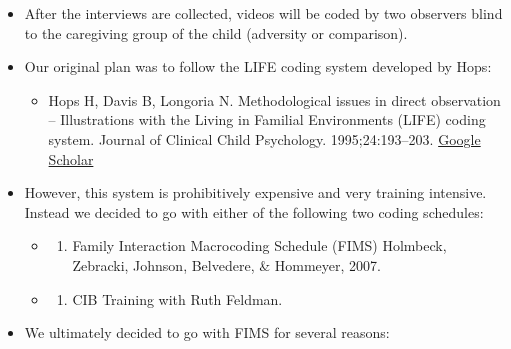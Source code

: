 \documentclass[]{book}
\providecommand{\tightlist}{%
  \setlength{\itemsep}{0pt}\setlength{\parskip}{0pt}}
\begin{document}
\begin{itemize}
\item
  After the interviews are collected, videos will be coded by two observers blind to the caregiving group of the child (adversity or comparison).
\item
  Our original plan was to follow the LIFE coding system developed by Hops:

  \begin{itemize}
  \tightlist
  \item
    Hops H, Davis B, Longoria N. Methodological issues in direct observation -- Illustrations with the Living in Familial Environments (LIFE) coding system. Journal of Clinical Child Psychology. 1995;24:193--203. \href{https://www.tandfonline.com/doi/abs/10.1207/s15374424jccp2402_7?journalCode=hcap19}{Google Scholar}
  \end{itemize}
\item
  However, this system is prohibitively expensive and very training intensive. Instead we decided to go with either of the following two coding schedules:

  \begin{itemize}
  \item
    \begin{enumerate}
    \def\labelenumi{\arabic{enumi}.}
    \tightlist
    \item
      Family Interaction Macrocoding Schedule (FIMS) Holmbeck, Zebracki, Johnson, Belvedere, \& Hommeyer, 2007.
    \end{enumerate}
  \item
    \begin{enumerate}
    \def\labelenumi{\arabic{enumi}.}
    \setcounter{enumi}{1}
    \tightlist
    \item
      CIB Training with Ruth Feldman.
    \end{enumerate}
  \end{itemize}
\item
  We ultimately decided to go with FIMS for several reasons:


\end{itemize}
\end{document}
